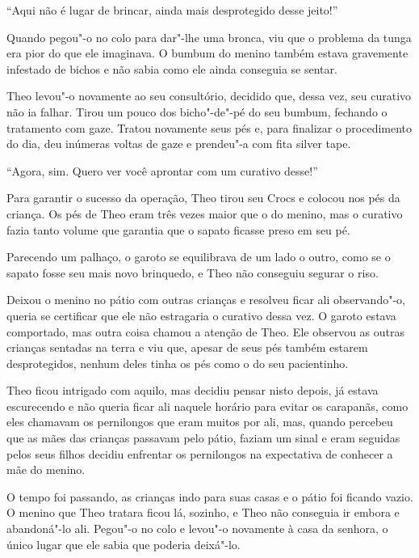 ``Aqui não é lugar de brincar, ainda mais desprotegido desse jeito!''

Quando pegou"-o no colo para dar"-lhe uma bronca, viu que o problema da
tunga era pior do que ele imaginava. O bumbum do menino também estava
gravemente infestado de bichos e não sabia como ele ainda conseguia se
sentar.

Theo levou"-o novamente ao seu consultório, decidido que, dessa vez, seu
curativo não ia falhar. Tirou um pouco dos bicho"-de"-pé do seu bumbum,
fechando o tratamento com gaze. Tratou novamente seus pés e, para
finalizar o procedimento do dia, deu inúmeras voltas de gaze e prendeu"-a
com fita silver tape.

``Agora, sim. Quero ver você aprontar com um curativo desse!''

Para garantir o sucesso da operação, Theo tirou seu Crocs e colocou nos
pés da criança. Os pés de Theo eram três vezes maior que o do menino,
mas o curativo fazia tanto volume que garantia que o sapato ficasse
preso em seu pé.

Parecendo um palhaço, o garoto se equilibrava de um lado o outro, como
se o sapato fosse seu mais novo brinquedo, e Theo não conseguiu segurar
o riso.

Deixou o menino no pátio com outras crianças e resolveu ficar ali
observando"-o, queria se certificar que ele não estragaria o curativo
dessa vez. O garoto estava comportado, mas outra coisa chamou a atenção
de Theo. Ele observou as outras crianças sentadas na terra e viu que,
apesar de seus pés também estarem desprotegidos, nenhum deles tinha os
pés como o do seu pacientinho.

Theo ficou intrigado com aquilo, mas decidiu pensar nisto depois, já
estava escurecendo e não queria ficar ali naquele horário para evitar os
carapanãs, como eles chamavam os pernilongos que eram muitos por ali,
mas, quando percebeu que as mães das crianças passavam pelo pátio,
faziam um sinal e eram seguidas pelos seus filhos decidiu enfrentar os
pernilongos na expectativa de conhecer a mãe do menino.

O tempo foi passando, as crianças indo para suas casas e o pátio foi
ficando vazio. O menino que Theo tratara ficou lá, sozinho, e Theo não
conseguia ir embora e abandoná"-lo ali. Pegou"-o no colo e levou"-o
novamente à casa da senhora, o único lugar que ele sabia que poderia
deixá"-lo.

\asterisc


